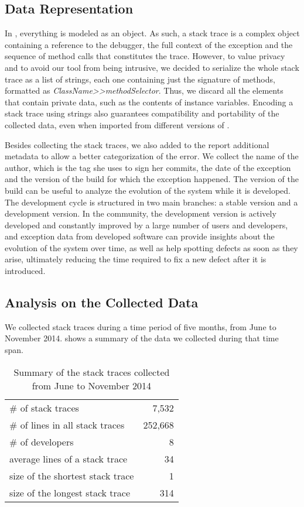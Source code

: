 \subsection{Data Representation}

In \pha, everything is modeled as an object.
As such, a stack trace is a complex object containing a reference to the debugger, the full context of the exception and the sequence of method calls that constitutes the trace.
However, to value privacy and to avoid our tool from being intrusive, we decided to serialize the whole stack trace as a list of strings, each one containing just the signature of methods, formatted as \textit{ClassName{>}{>}methodSelector}.
Thus, we discard all the elements that contain private data, such as the contents of instance variables.
Encoding a stack trace using strings also guarantees compatibility and portability of the collected data, even when imported from different versions of \pha.

Besides collecting the stack traces, we also added to the report additional metadata to allow a better categorization of the error.
We collect the name of the author, which is the tag she uses to sign her commits, the date of the exception and the version of the \pha build for which the exception happened.
The version of the build can be useful to analyze the evolution of the system while it is developed.
The \pha development cycle is structured in two main branches: a stable version and a development version.
In the \pha community, the development version is actively developed and constantly improved by a large number of users and developers, and exception data from developed software can provide insights about the evolution of the system over time, as well as help spotting defects as soon as they arise, ultimately reducing the time required to fix a new defect after it is introduced.

\subsection{Analysis on the Collected Data}

We collected stack traces during a time period of five months, from June to November 2014.
 shows a summary of the data we collected during that time span.

\begin{table}[ht]\small
\centering
\caption{Summary of the stack traces collected from June to November 2014}
\begin{tabular}{lr} \hline
\# of stack traces & 7,532 \\
\# of lines in all stack traces & 252,668 \\
\# of developers & 8 \\
average lines of a stack trace & 34 \\
size of the shortest stack trace & 1 \\
size of the longest stack trace & 314 \\ \hline
\end{tabular}
\label{tab:data-summary}
\end{table}

